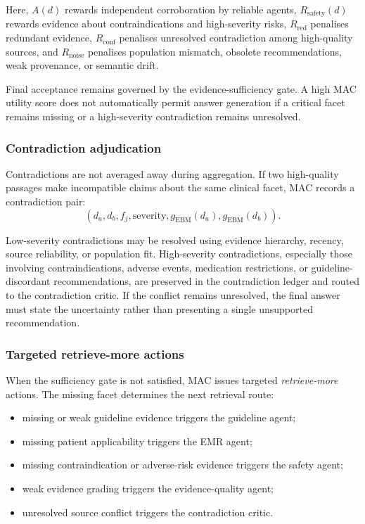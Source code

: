 \documentclass[conference]{IEEEtran}
\begin{document}
Here, $A(d)$ rewards independent corroboration by reliable agents, $R_{\mathrm{safety}}(d)$ rewards evidence about contraindications and high-severity risks, $R_{\mathrm{red}}$ penalises redundant evidence, $R_{\mathrm{conf}}$ penalises unresolved contradiction among high-quality sources, and $R_{\mathrm{noise}}$ penalises population mismatch, obsolete recommendations, weak provenance, or semantic drift.

Final acceptance remains governed by the evidence-sufficiency gate. A high MAC utility score does not automatically permit answer generation if a critical facet remains missing or a high-severity contradiction remains unresolved.

\subsubsection*{Contradiction adjudication}

Contradictions are not averaged away during aggregation. If two high-quality passages make incompatible claims about the same clinical facet, MAC records a contradiction pair:
\[
(d_a,d_b,f_j,\mathrm{severity},g_{\mathrm{EBM}}(d_a),g_{\mathrm{EBM}}(d_b)).
\]

Low-severity contradictions may be resolved using evidence hierarchy, recency, source reliability, or population fit. High-severity contradictions, especially those involving contraindications, adverse events, medication restrictions, or guideline-discordant recommendations, are preserved in the contradiction ledger and routed to the contradiction critic. If the conflict remains unresolved, the final answer must state the uncertainty rather than presenting a single unsupported recommendation.

\subsubsection*{Targeted retrieve-more actions}

When the sufficiency gate is not satisfied, MAC issues targeted \textit{retrieve-more} actions. The missing facet determines the next retrieval route:

\begin{itemize}
    \item missing or weak guideline evidence triggers the guideline agent;
    \item missing patient applicability triggers the EMR agent;
    \item missing contraindication or adverse-risk evidence triggers the safety agent;
    \item weak evidence grading triggers the evidence-quality agent;
    \item unresolved source conflict triggers the contradiction critic.
\end{itemize}
\end{document}
